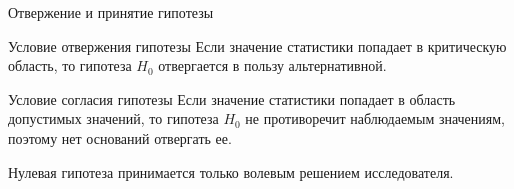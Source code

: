 \documentclass[unicode,11pt,notheorems,xcolor=table]{beamer}
\begin{document}
\begin{frame}{Отвержение и принятие гипотезы}{}
    \begin{alertblock}{Условие отвержения гипотезы}
        Если значение статистики попадает в критическую область, то гипотеза $H_0$ отвергается в пользу альтернативной.
    \end{alertblock}

    \vspace{15mm}
    
    \begin{exampleblock}{Условие согласия гипотезы}
        Если значение статистики попадает в область допустимых значений, то гипотеза $H_0$ не противоречит наблюдаемым значениям, поэтому нет оснований отвергать ее.

        \vspace{5mm}
        \alert{Нулевая гипотеза принимается только волевым решением исследователя.}
    \end{exampleblock}
\end{frame}


\end{document}

